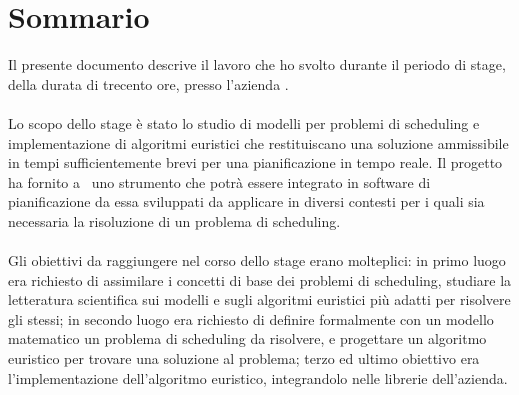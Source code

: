 
\cleardoublepage
{}
{}
\begingroup
\let\clearpage\relax
\let\cleardoublepage\relax
\let\cleardoublepage\relax

\chapter*{Sommario}

Il presente documento descrive il lavoro che ho svolto durante il periodo di stage, della durata di trecento ore, presso l'azienda \TS. \\ \\
Lo scopo dello stage è stato lo studio di modelli per problemi di scheduling e implementazione di algoritmi euristici che restituiscano una soluzione ammissibile in tempi sufficientemente brevi per una pianificazione in tempo reale. Il progetto ha fornito a \TS\ uno strumento che potrà essere integrato in software di pianificazione da essa sviluppati da applicare in diversi contesti per i quali sia necessaria la risoluzione di un problema di scheduling. \\ \\
Gli obiettivi da raggiungere nel corso dello stage erano molteplici: 
in primo luogo era richiesto di assimilare i concetti di base dei problemi di scheduling, studiare la letteratura scientifica sui modelli e sugli algoritmi euristici più adatti per risolvere gli stessi; in secondo luogo era richiesto di definire formalmente con un modello matematico un problema di scheduling da risolvere, e progettare un algoritmo euristico per trovare una soluzione al problema; terzo ed ultimo obiettivo era l'implementazione dell'algoritmo euristico, integrandolo nelle librerie dell'azienda.

\endgroup			

\vfill

